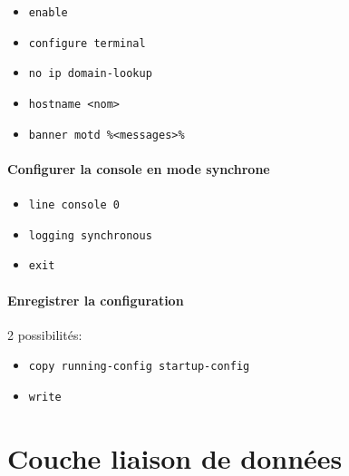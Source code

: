 \documentclass[a4paper]{article}
\begin{document}
\begin{itemize}[label=\textbf{–}]
    \item \texttt{enable}
    \item \texttt{configure terminal}
    \item \texttt{no ip domain-lookup}
    \item \texttt{hostname <nom>}
    \item \texttt{banner motd \%<messages>\%}
\end{itemize}





\subsection{Configurer la console en mode synchrone}



\begin{itemize}[label=\textbf{–}]
    \item \texttt{line console 0}
    \item \texttt{logging synchronous}
    \item \texttt{exit}
\end{itemize}





\subsection{Enregistrer la configuration}



2 possibilités:
\begin{itemize}[label=\textbf{–}]
    \item \texttt{copy running-config startup-config}
    \item \texttt{write}
\end{itemize}















\part{Couche liaison de données}
\end{document}
